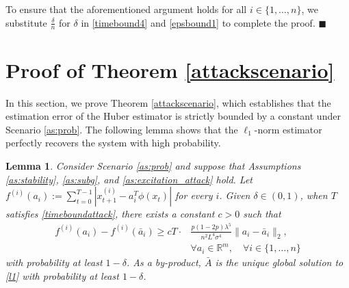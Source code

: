 \documentclass[letterpaper,10pt,conference]{ieeeconf}
\theoremstyle{plain} %
\newtheorem{lemma}{Lemma}
\theoremstyle{plain} %
\theoremstyle{plain} %
\theoremstyle{plain}
\begin{document}
To ensure that the aforementioned argument holds for all $i\in\{1,\dots,n\}$, we substitute $\frac{\delta}{n}$ for $\delta$ in \eqref{timebound4} and \eqref{epsbound1} to  complete the proof.
\hfill $\blacksquare$



\section{Proof of Theorem \ref{attackscenario}}\label{sec:proofthm2}
In this section, we prove Theorem \ref{attackscenario}, which establishes that the estimation error of the Huber estimator is strictly bounded by a constant under Scenario \ref{as:prob}. 
The following lemma shows that  the $\ell_1$-norm estimator perfectly recovers the system with high probability.
\begin{lemma}\label{lem:excitation}
 Consider Scenario \ref{as:prob} and suppose that  Assumptions \ref{as:stability}, \ref{as:subg},   and \ref{as:excitation_attack} hold. 
    Let $f^{(i)}(a_i):= \sum_{t=0}^{T-1} |x_{t+1}^{(i)} -  a_i^T \phi(x_t)| $ for every $i$. 
    Given $\delta\in(0,1)$, when $T$ satisfies \eqref{timeboundattack}, 
there exists a constant $c>0$ such that
\begin{align*}
    f^{(i)}(a_i) - f^{(i)}(\bar a_i) \ge c T\cdot &\frac{p(1-2p)\lambda^5 }{n^2 L^4\sigma^4 } \|a_i - \bar a_i\|_2, \\&\forall a_i \in \mathbb{R}^m, \quad \forall i\in\{1,\dots, n\}
\end{align*}
with probability at least $1-\delta$.
As a by-product, 
$\bar A$ is the unique global solution to \eqref{l1} with probability at least $1-\delta$.
\end{lemma}
\end{document}
